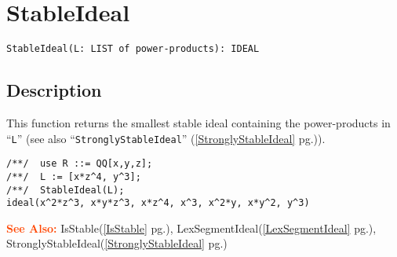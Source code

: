 \documentclass[a4paper]{mybook}
\newenvironment{command}{}{} %
\newcommand\SeeAlso{\par\textcolor{OrangeRed}{\textbf{\large See Also: }}}
\begin{document}
\section{StableIdeal}
\label{StableIdeal}
\begin{command} %


\begin{Verbatim}[label=syntax, rulecolor=\color{MidnightBlue},
frame=single]
StableIdeal(L: LIST of power-products): IDEAL
\end{Verbatim}


\subsection*{Description}

This function returns the smallest stable ideal containing the
power-products in ``\verb&L&'' (see also ``\verb&StronglyStableIdeal&'' (\ref{StronglyStableIdeal} pg.\pageref{StronglyStableIdeal})).
\begin{Verbatim}[label=example, rulecolor=\color{PineGreen}, frame=single]
/**/  use R ::= QQ[x,y,z];
/**/  L := [x*z^4, y^3];
/**/  StableIdeal(L);
ideal(x^2*z^3, x*y*z^3, x*z^4, x^3, x^2*y, x*y^2, y^3)
\end{Verbatim}


\SeeAlso %
  IsStable(\ref{IsStable} pg.\pageref{IsStable}), 
    LexSegmentIdeal(\ref{LexSegmentIdeal} pg.\pageref{LexSegmentIdeal}), 
    StronglyStableIdeal(\ref{StronglyStableIdeal} pg.\pageref{StronglyStableIdeal})
\end{command} %
\end{document}
